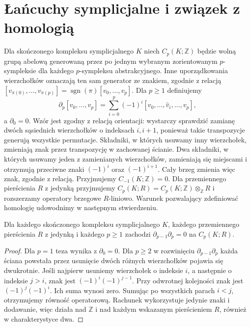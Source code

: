 \section{Łańcuchy symplicjalne i związek z homologią}
\label{sec:tg-simplicial-chain}

\begin{definicja}
Dla skończonego kompleksu symplicjalnego $K$ niech
$C_p(K;\mathbb Z)$ będzie wolną grupą abelową generowaną
przez po jednym wybranym zorientowanym $p$-sympleksie
dla każdego $p$-sympleksu abstrakcyjnego. Inne uporządkowania
wierzchołków oznaczają ten sam generator ze znakiem,
zgodnie z relacją
$[v_{\pi(0)},\ldots,v_{\pi(p)}]
=\operatorname{sgn}(\pi)[v_0,\ldots,v_p]$.
Dla $p\ge1$ definiujemy
\[
\partial_p[v_0,\ldots,v_p]
=\sum_{i=0}^p(-1)^i
[v_0,\ldots,\widehat v_i,\ldots,v_p],
\]
a $\partial_0=0$. Wzór jest zgodny z relacją orientacji:
wystarczy sprawdzić zamianę dwóch sąsiednich wierzchołków
o indeksach $i,i+1$, ponieważ takie transpozycje generują
wszystkie permutacje. Składniki, w których usuwamy inny
wierzchołek, zmieniają znak przez transpozycję w zachowanej
ścianie. Dwa składniki, w których usuwamy jeden z
zamienianych wierzchołków, zamieniają się miejscami
i otrzymują przeciwne znaki $(-1)^i$ oraz $(-1)^{i+1}$.
Cały brzeg zmienia więc znak, zgodnie z relacją.
Przyjmujemy $C_{-1}(K;\mathbb Z)=0$.
Dla przemiennego pierścienia $R$ z jedynką przyjmujemy
$C_p(K;R)=C_p(K;\mathbb Z)\otimes_{\mathbb Z}R$
i rozszerzamy operatory brzegowe $R$-liniowo.
Warunek pozwalający zdefiniować homologię udowodnimy
w następnym stwierdzeniu.
\end{definicja}

\begin{stwierdzenie}
\label{prop:tg-simplicial-boundary-square}
Dla każdego skończonego kompleksu symplicjalnego $K$,
każdego przemiennego pierścienia $R$ z jedynką
i każdego $p\ge1$ zachodzi $\partial_{p-1}\partial_p=0$
na $C_p(K;R)$.
\end{stwierdzenie}

\begin{proof}
Dla $p=1$ teza wynika z $\partial_0=0$. Dla $p\ge2$
w rozwinięciu $\partial_{p-1}\partial_p$ każda ściana
powstała przez usunięcie dwóch różnych wierzchołków
pojawia się dwukrotnie. Jeśli najpierw usuniemy wierzchołek
o indeksie $i$, a następnie o indeksie $j>i$, znak jest
$(-1)^i(-1)^{j-1}$. Przy odwrotnej kolejności znak jest
$(-1)^j(-1)^i$. Ich suma wynosi zero. Sumując po wszystkich
parach $i<j$, otrzymujemy równość operatorową.
Rachunek wykorzystuje jedynie znaki i dodawanie,
więc działa nad $\mathbb Z$ i nad każdym wskazanym
pierścieniem $R$, również w charakterystyce dwa.
\end{proof}

